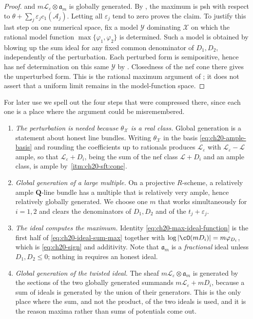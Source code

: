 \begin{proof}
and $m\mathcal L_\varepsilon\otimes\mathfrak a_m$ is globally
generated.  By , the maximum is psh with
respect to
$\theta+\sum_j\varepsilon_jc_1(\mathcal A_j)$.  Letting all
$\varepsilon_j$ tend to zero proves the claim.  To justify this last step
on one numerical space, fix a model $\mathcal Y$ dominating
$\mathcal X$ on which the rational model function
$\max\{\varphi_1,\varphi_2\}$ is determined.  Such a model is obtained
by blowing up the sum ideal for any fixed common denominator of
$D_1,D_2$, independently of the perturbation.  Each perturbed form is
semipositive, hence has nef determination on this same $\mathcal Y$ by
.  Closedness of the nef cone
there gives the unperturbed form.  This is the rational maximum argument of
\cite[Proposition~5.8]{BFJ16}; it does not assert that a uniform limit
remains in the model-function space.
\end{proof}

For later use we spell out the four steps that were compressed there, since
each one is a place where the argument could be misremembered.

\begin{enumerate}
\item \emph{The perturbation is needed because $\theta_{\mathcal X}$ is a
 real class.}  Global generation is a statement about honest line bundles.
 Writing $\theta_{\mathcal X}$ in the basis \eqref{eq:ch20-ample-basis}
 and rounding the coefficients up to rationals produces
 $\mathcal L_\varepsilon$ with $\mathcal L_\varepsilon-\mathcal L$
 ample, so that $\mathcal L_\varepsilon+D_i$, being the sum of the nef
 class $\mathcal L+D_i$ and an ample class, is ample by
 \,\cref{itm:ch20-sft:cone}.
\item \emph{Global generation of a large multiple.}  On a projective
 $R$-scheme, a relatively ample $\mathbf Q$-line bundle has a multiple
 that is relatively very ample, hence relatively globally generated.  We
 choose one $m$ that works simultaneously for $i=1,2$ and clears the
 denominators of $D_1,D_2$ and of the $t_j+\varepsilon_j$.
\item \emph{The ideal computes the maximum.}  Identity
 \eqref{eq:ch20-max-ideal-function} is the first half of
 \eqref{eq:ch20-ideal-sum-max} together with
 $\log|\cO(mD_i)|=m\varphi_{D_i}$, which is
 \eqref{eq:ch20-sign} and additivity.  Note that
 $\mathfrak a_m$ is a \emph{fractional} ideal unless $D_1,D_2\leq0$;
 nothing in  requires an honest ideal.
\item \emph{Global generation of the twisted ideal.}  The sheaf
 $m\mathcal L_\varepsilon\otimes\mathfrak a_m$ is generated by the
 sections of the two globally generated summands
 $m\mathcal L_\varepsilon+mD_i$, because a sum of ideals is generated by
 the union of their generators.  This is the only place where the sum, and
 not the product, of the two ideals is used, and it is the reason maxima
 rather than sums of potentials come out.
\end{enumerate}

